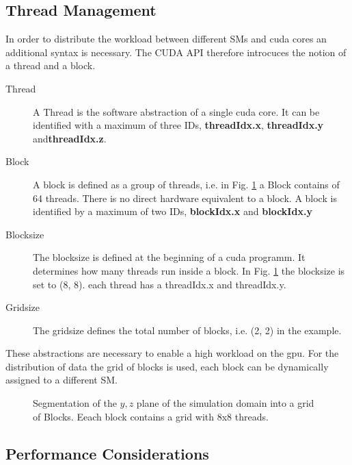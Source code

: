 \clearpage

\subsection{Thread Management}

In order to distribute the workload between different SMs and cuda cores an additional syntax is necessary.
The CUDA API therefore  introcuces the notion of a thread and a block.

\begin{description}
    \item[Thread] A Thread is the software abstraction of a single cuda core. It can be identified with
                   a maximum of three IDs, \textbf{threadIdx.x}, \textbf{threadIdx.y} and\textbf{threadIdx.z}.

    \item[Block] A block is defined as a group of threads, i.e. in Fig. \ref{cuda:grid_example} a Block contains of 64 threads.
                 There  is no direct hardware equivalent to a block.
                 A block is identified by a maximum of two IDs, \textbf{blockIdx.x} and \textbf{blockIdx.y}

    \item[Blocksize] The blocksize is defined at the beginning of a cuda programm. It determines how
                    many threads run inside a block. In Fig. \ref{cuda:grid_example} the blocksize is set to (8, 8).
                    each thread has a threadIdx.x and threadIdx.y.

    \item[Gridsize] The gridsize defines the total number of blocks, i.e. (2, 2) in the example.
\end{description}

These abstractions are necessary to enable a high workload on the gpu.
For the distribution of data the grid of blocks is used, each block can be dynamically assigned to a different SM.

\begin{figure}[!bp]
      \centering
       \caption{Segmentation of the $y, z$ plane of the simulation domain into a grid of Blocks.
                 Eeach block contains a grid with 8x8 threads.}
       \label{cuda:grid_example}
\end{figure}

\subsection{Performance Considerations}

